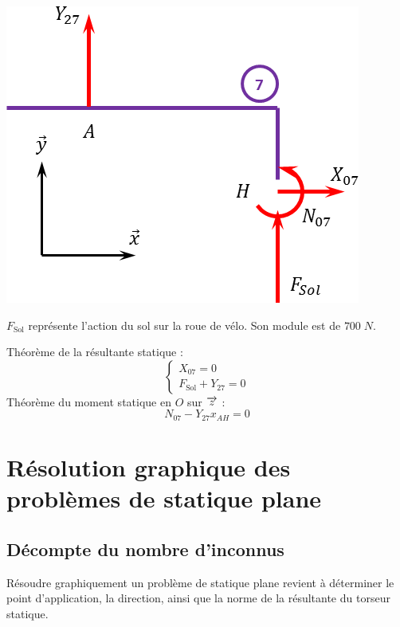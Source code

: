 \documentclass[11pt,oneside]{article}
\begin{document}
\begin{exemple}
\begin{minipage}[c]{.35\linewidth}
\begin{center}
\includegraphics[width=.9\textwidth]{png/7}
\end{center}
\end{minipage}\hfill
\begin{minipage}[c]{.6\linewidth}
$F_{\text{Sol}}$ représente l'action du sol sur la roue de vélo. Son module est de $700\; N$. 

Théorème de la résultante statique : 
$$
\left\{
\begin{array}{l}
X_{07}=0 \\
F_{\text{Sol}}+Y_{27}=0 
\end{array}
\right.
$$
Théorème du moment statique en $O$ sur $\overrightarrow{z}$ : 
$$
N_{07}-Y_{27}x_{AH}=0
$$
\end{minipage}
\end{exemple}
\section{Résolution graphique des problèmes de statique plane}

\subsection{Décompte du nombre d'inconnus}
Résoudre graphiquement un problème de statique plane revient à déterminer le point d'application, la direction, ainsi que la norme de la résultante du torseur statique. 
\end{document}
